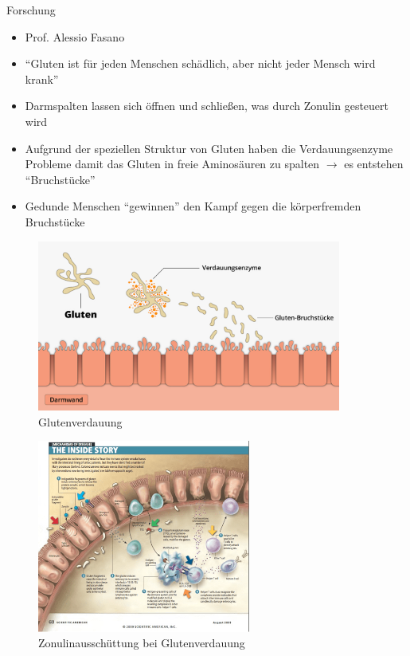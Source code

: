 \documentclass[xcolor=dvipsnames]{beamer}
\begin{document}
\begin{frame}[allowframebreaks]
        \framebreak

        \begin{block}{Forschung}
            \begin{itemize}
                \setlength\itemsep{1em}
                \item Prof. Alessio Fasano
                \item "`Gluten ist für jeden Menschen schädlich, aber nicht jeder Mensch wird krank"'
                \item Darmspalten lassen sich öffnen und schließen, was durch Zonulin gesteuert wird
                \item Aufgrund der speziellen Struktur von Gluten haben die Verdauungsenzyme Probleme damit das
                Gluten in freie Aminosäuren zu spalten $\rightarrow$ es entstehen "`Bruchstücke"'
                \item Gedunde Menschen "`gewinnen"' den Kampf gegen die körperfremden Bruchstücke
            \end{itemize}
        \end{block}

        \framebreak

        \begin{figure}
            \centering
            \includegraphics[width=10cm]{../images/gluten.jpg}
            \caption{Glutenverdauung}
        \end{figure}

        \framebreak

        \begin{figure}
            \centering
            \includegraphics[width=7cm]{../images/zonulin.png}
            \caption{Zonulinausschüttung bei Glutenverdauung}
        \end{figure}
    \end{frame}
\end{document}
